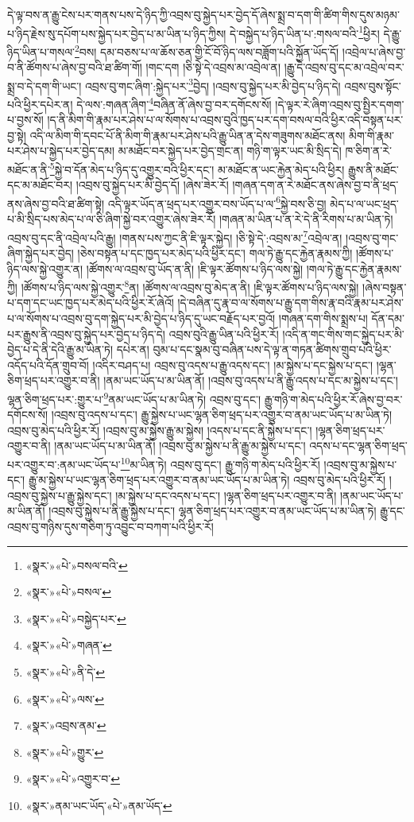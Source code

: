 དེ་ལྟ་བས་ན་རྒྱུ་ངེས་པར་གནས་པས་དེ་ཉིད་ཀྱི་འབྲས་བུ་སྐྱེད་པར་བྱེད་དོ་ཞེས་སྨྲ་བ་དག་གི་ཚིག་གིས་དུས་མཉམ་པ་ཉིད་རྗེས་སུ་དཔོག་པས་སྐྱེད་པར་བྱེད་པ་མ་ཡིན་པ་ཉིད་ཀྱིས། དེ་བསྐྱེད་པ་ཉིད་ཡིན་པ་:གསལ་བའི་\footnote{«སྣར་»«པེ་»བསལ་བའི་}ཕྱིར། དེ་རྒྱུ་ཉིད་ཡིན་པ་གསལ་\footnote{«སྣར་»«པེ་»བསལ་}བས། དམ་བཅས་པ་ལ་ཆོས་ཅན་གྱི་ངོ་བོ་ཉིད་ལས་བཟློག་པའི་སྐྱོན་ཡོད་དོ། །འབྲེལ་པ་ཞེས་བྱ་བ་ནི་ཚོགས་པ་ཞེས་བྱ་བའི་ཐ་ཚིག་གོ། །གང་དག །ཅི་སྟེ་དེ་འབྲས་མ་འབྲེལ་ན། །རྒྱུ་དེ་འབྲས་བུ་དང་མ་འབྲེལ་བར་སྨྲ་བ་དེ་དག་གི་ཡང་། འབྲས་བུ་གང་ཞིག་:སྐྱེད་པར་\footnote{«སྣར་»«པེ་»བསྐྱེད་པར་}བྱེད། །འབྲས་བུ་སྐྱེད་པར་མི་བྱེད་པ་ཉིད་དེ། འབྲས་བུས་སྟོང་པའི་ཕྱིར་དཔེར་ན། དེ་ལས་:གཞན་ཞིག་\footnote{«སྣར་»«པེ་»གཞན་}བཞིན་ནོ་ཞེས་བྱ་བར་དགོངས་སོ། །དེ་ལྟར་རེ་ཞིག་འབྲས་བུ་སྤྱིར་དགག་པ་བྱས་སོ། །ད་ནི་མིག་གི་རྣམ་པར་ཤེས་པ་ལ་སོགས་པ་འབྲས་བུའི་ཁྱད་པར་དག་བསལ་བའི་ཕྱིར་འདི་བསྟན་པར་བྱ་སྟེ། འདི་ལ་མིག་གི་དབང་པོ་ནི་མིག་གི་རྣམ་པར་ཤེས་པའི་རྒྱུ་ཡིན་ན་དེས་གཟུགས་མཐོང་ནས། མིག་གི་རྣམ་པར་ཤེས་པ་སྐྱེད་པར་བྱེད་དམ། མ་མཐོང་བར་སྐྱེད་པར་བྱེད་གྲང་ན། གཉི་ག་ལྟར་ཡང་མི་སྲིད་དེ། ཁ་ཅིག་ན་རེ་མཐོང་ན་ནི་\footnote{«སྣར་»«པེ་»ནི་དེ་}སྐྱེ་བ་དོན་མེད་པ་ཉིད་དུ་འགྱུར་བའི་ཕྱིར་དང་། མ་མཐོང་ན་ཡང་རྐྱེན་མེད་པའི་ཕྱིར། རྒྱུས་ནི་མཐོང་དང་མ་མཐོང་བར། །འབྲས་བུ་སྐྱེད་པར་མི་བྱེད་དོ། །ཞེས་ཟེར་རོ། །གཞན་དག་ན་རེ་མཐོང་ནས་ཞེས་བྱ་བ་ནི་ཕྲད་ནས་ཞེས་བྱ་བའི་ཐ་ཚིག་སྟེ། འདི་ལྟར་ཡོད་ན་ཕྲད་པར་འགྱུར་བས་ཡོད་པ་ལ་\footnote{«སྣར་»«པེ་»ལས་}སྐྱེ་བས་ཅི་བྱ། མེད་པ་ལ་ཡང་ཕྲད་པ་མི་སྲིད་པས་མེད་པ་ལ་ཅི་ཞིག་སྐྱེ་བར་འགྱུར་ཞེས་ཟེར་རོ། །གཞན་མ་ཡིན་པ་ན་རེ་དེ་ནི་རིགས་པ་མ་ཡིན་ཏེ། འབྲས་བུ་དང་ནི་འབྲེལ་པའི་རྒྱུ། །གནས་པས་ཀྱང་ནི་ཇི་ལྟར་སྐྱེད། །ཅི་སྟེ་དེ་:འབྲས་མ་\footnote{«སྣར་»འབྲས་ནམ་}འབྲེལ་ན། །འབྲས་བུ་གང་ཞིག་སྐྱེད་པར་བྱེད། །ཅེས་བསྟན་པ་དང་ཁྱད་པར་མེད་པའི་ཕྱིར་དང་། གལ་ཏེ་རྒྱུ་དང་རྐྱེན་རྣམས་ཀྱི། །ཚོགས་པ་ཉིད་ལས་སྐྱེ་འགྱུར་ན། །ཚོགས་ལ་འབྲས་བུ་ཡོད་ན་ནི། །ཇི་ལྟར་ཚོགས་པ་ཉིད་ལས་སྐྱེ། །གལ་ཏེ་རྒྱུ་དང་རྐྱེན་རྣམས་ཀྱི། །ཚོགས་པ་ཉིད་ལས་སྐྱེ་འགྱུར་\footnote{«སྣར་»«པེ་»གྱུར་}ན། །ཚོགས་ལ་འབྲས་བུ་མེད་ན་ནི། །ཇི་ལྟར་ཚོགས་པ་ཉིད་ལས་སྐྱེ། །ཞེས་བསྟན་པ་དག་དང་ཡང་ཁྱད་པར་མེད་པའི་ཕྱིར་རོ་ཞེའོ། །དེ་བཞིན་དུ་རྣ་བ་ལ་སོགས་པ་རྒྱུ་དག་གིས་རྣ་བའི་རྣམ་པར་ཤེས་པ་ལ་སོགས་པ་འབྲས་བུ་དག་སྐྱེད་པར་མི་བྱེད་པ་ཉིད་དུ་ཡང་བརྗོད་པར་བྱའོ། །གཞན་དག་གིས་སྨྲས་པ། དོན་དམ་པར་རྒྱུས་ནི་འབྲས་བུ་སྐྱེད་པར་བྱེད་པ་ཉིད་དེ། འབྲས་བུའི་རྒྱུ་ཡིན་པའི་ཕྱིར་རོ། །འདི་ན་གང་གིས་གང་སྐྱེད་པར་མི་བྱེད་པ་དེ་ནི་དེའི་རྒྱུ་མ་ཡིན་ཏེ། དཔེར་ན། བུམ་པ་དང་སྣམ་བུ་བཞིན་པས་དེ་ལྟ་ན་གཏན་ཚིགས་གྲུབ་པའི་ཕྱིར་འདོད་པའི་དོན་གྲུབ་བོ། །འདིར་བཤད་པ། འབྲས་བུ་འདས་པ་རྒྱུ་འདས་དང་། །མ་སྐྱེས་པ་དང་སྐྱེས་པ་དང་། །ལྷན་ཅིག་ཕྲད་པར་འགྱུར་བ་ནི། །ནམ་ཡང་ཡོད་པ་མ་ཡིན་ནོ། །འབྲས་བུ་འདས་པ་ནི་རྒྱུ་འདས་པ་དང་མ་སྐྱེས་པ་དང་། ལྷན་ཅིག་ཕྲད་པར་:གྱུར་པ་\footnote{«སྣར་»«པེ་»འགྱུར་བ་}ནམ་ཡང་ཡོད་པ་མ་ཡིན་ཏེ། འབྲས་བུ་དང་། རྒྱུ་གཉི་ག་མེད་པའི་ཕྱིར་རོ་ཞེས་བྱ་བར་དགོངས་སོ། །འབྲས་བུ་འདས་པ་དང་། རྒྱུ་སྐྱེས་པ་ཡང་ལྷན་ཅིག་ཕྲད་པར་འགྱུར་བ་ནམ་ཡང་ཡོད་པ་མ་ཡིན་ཏེ། འབྲས་བུ་མེད་པའི་ཕྱིར་རོ། །འབྲས་བུ་མ་སྐྱེས་རྒྱུ་མ་སྐྱེས། །འདས་པ་དང་ནི་སྐྱེས་པ་དང་། །ལྷན་ཅིག་ཕྲད་པར་འགྱུར་བ་ནི། །ནམ་ཡང་ཡོད་པ་མ་ཡིན་ནོ། །འབྲས་བུ་མ་སྐྱེས་པ་ནི་རྒྱུ་མ་སྐྱེས་པ་དང་། འདས་པ་དང་ལྷན་ཅིག་ཕྲད་པར་འགྱུར་བ་:ནམ་ཡང་ཡོད་པ་\footnote{«སྣར་»ནམ་ཡང་ཡོད་«པེ་»ནམ་ཡོད་}མ་ཡིན་ཏེ། འབྲས་བུ་དང་། རྒྱུ་གཉི་ག་མེད་པའི་ཕྱིར་རོ། །འབྲས་བུ་མ་སྐྱེས་པ་དང་། རྒྱུ་མ་སྐྱེས་པ་ཡང་ལྷན་ཅིག་ཕྲད་པར་འགྱུར་བ་ནམ་ཡང་ཡོད་པ་མ་ཡིན་ཏེ། འབྲས་བུ་མེད་པའི་ཕྱིར་རོ། །འབྲས་བུ་སྐྱེས་པ་རྒྱུ་སྐྱེས་དང་། །མ་སྐྱེས་པ་དང་འདས་པ་དང་། །ལྷན་ཅིག་ཕྲད་པར་འགྱུར་བ་ནི། །ནམ་ཡང་ཡོད་པ་མ་ཡིན་ནོ། །འབྲས་བུ་སྐྱེས་པ་ནི་རྒྱུ་སྐྱེས་པ་དང་། ལྷན་ཅིག་ཕྲད་པར་འགྱུར་བ་ནམ་ཡང་ཡོད་པ་མ་ཡིན་ཏེ། རྒྱུ་དང་འབྲས་བུ་གཉིས་དུས་གཅིག་ཏུ་འབྱུང་བ་བཀག་པའི་ཕྱིར་རོ། 